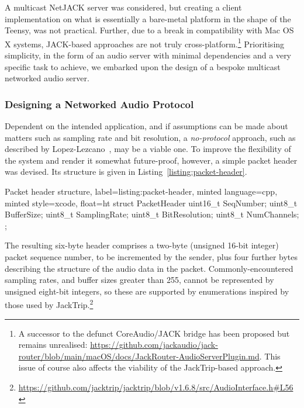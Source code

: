 \documentclass[utf8]{FrontiersinHarvard}
\newcommand{\lstref}[1]{Listing~\ref{#1}}
\begin{document}
    A multicast NetJACK server was considered, but creating a client
    implementation on what is essentially a bare-metal platform in the shape of
    the Teensy, was not practical.
    Further, due to a break in compatibility with Mac OS X systems, JACK-based
    approaches are not truly cross-platform.\footnote{
        A successor to the defunct CoreAudio/JACK bridge has been proposed but
        remains unrealised:
        \url{https://github.com/jackaudio/jack-router/blob/main/macOS/docs/JackRouter-AudioServerPlugin.md}.
        This issue of course also affects the viability of the JackTrip-based
        approach.
    }
    Prioritising simplicity, in the form of an audio server with minimal
    dependencies and a very specific task to achieve, we embarked upon the
    design of a bespoke multicast networked audio server.

    \subsubsection{Designing a Networked Audio Protocol}\label{subsubsec:designing-a-protocol}

    Dependent on the intended application, and if assumptions can be made about
    matters such as sampling rate and bit resolution, a \textit{no-protocol}
    approach, such as described by
    Lopez-Lezcano~\citep{lopez-lezcano_jack_2012}, may be a viable one.
    To improve the flexibility of the system and render it somewhat
    future-proof, however, a simple packet header was devised.
    Its structure is given in \lstref{listing:packet-header}.

    \begin{codelisting}{
        Packet header structure,
        label=listing:packet-header,
        minted language=cpp,
        minted style=xcode,
        float=ht
    }
        struct PacketHeader {
            uint16_t SeqNumber;
            uint8_t BufferSize;
            uint8_t SamplingRate;
            uint8_t BitResolution;
            uint8_t NumChannels;
        };
    \end{codelisting}

    The resulting six-byte header comprises a two-byte (unsigned 16-bit integer)
    packet sequence number, to be incremented by the sender, plus four further bytes
    describing the structure of the audio data in the packet.
    Commonly-encountered sampling rates, and buffer sizes greater than 255, cannot
    be represented by unsigned eight-bit integers, so these are supported by
    enumerations inspired by those used by JackTrip.\footnote{
        \url{https://github.com/jacktrip/jacktrip/blob/v1.6.8/src/AudioInterface.h\#L56}
    }
\end{document}

